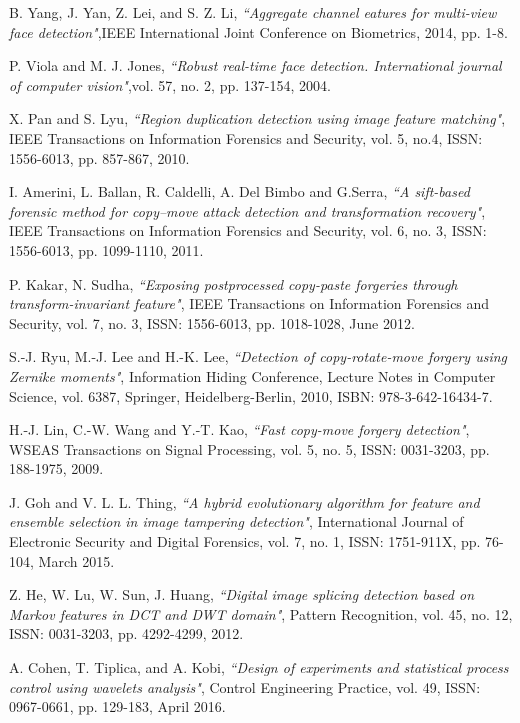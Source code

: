 B. Yang, J. Yan, Z. Lei, and S. Z. Li,
\textit{``Aggregate channel eatures for multi-view face detection"},IEEE International Joint Conference on Biometrics, 
2014, pp. 1-8.

P. Viola and M. J. Jones,
\textit{``Robust real-time face detection. International journal of computer vision"},vol. 57, no. 2, pp. 137-154, 2004.

X. Pan and S. Lyu,
\textit{``Region duplication detection using image feature matching"},
IEEE Transactions on Information Forensics and Security,
vol. 5, no.4, ISSN: 1556-6013, pp. 857-867, 2010.
	
I. Amerini, L. Ballan, R. Caldelli, A. Del Bimbo and G.Serra,
\textit{``A sift-based forensic method for copy–move attack detection and transformation recovery"},
IEEE Transactions on Information Forensics and Security,
vol. 6, no. 3, ISSN: 1556-6013, pp. 1099-1110, 2011.

P. Kakar, N. Sudha,
\textit{``Exposing postprocessed copy-paste forgeries through transform-invariant feature"},
IEEE Transactions on Information Forensics and Security,
vol. 7, no. 3, ISSN: 1556-6013, pp. 1018-1028, June 2012.

S.-J. Ryu, M.-J. Lee and H.-K. Lee,
\textit{``Detection of copy-rotate-move forgery using Zernike moments"},
Information Hiding Conference, Lecture Notes in Computer Science, vol. 6387, Springer,
Heidelberg-Berlin, 2010, ISBN: 978-3-642-16434-7.

H.-J. Lin, C.-W. Wang and Y.-T. Kao,
\textit{``Fast copy-move forgery detection"},
WSEAS Transactions on Signal Processing,
vol. 5, no. 5, ISSN: 0031-3203, pp. 188-1975, 2009.

J. Goh and V. L. L. Thing,
\textit{``A hybrid evolutionary algorithm for feature and ensemble selection in image tampering detection"},
International Journal of Electronic Security and Digital Forensics,
vol. 7, no. 1, ISSN: 1751-911X, pp. 76-104, March 2015.

Z. He, W. Lu, W. Sun, J. Huang,
\textit{``Digital image splicing detection based on Markov features in DCT and DWT domain"},
Pattern Recognition, vol. 45, no. 12, ISSN: 0031-3203, pp. 4292-4299, 2012.

A. Cohen, T. Tiplica, and A. Kobi,
\textit{``Design of experiments and statistical process control using wavelets analysis"},
Control Engineering Practice,
vol. 49, ISSN: 0967-0661, pp. 129-183, April 2016.